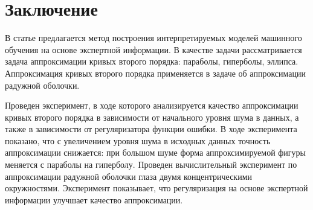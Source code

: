 \documentclass[12pt]{a&t}
\begin{document}
\section{Заключение}
В статье предлагается метод построения интерпретируемых моделей машинного обучения на основе экспертной информации. В качестве задачи рассматривается задача аппроксимации кривых второго порядка: параболы, гиперболы, эллипса. Аппроксимация кривых второго порядка применяется в задаче об аппроксимации радужной оболочки.

Проведен эксперимент, в ходе которого анализируется качество аппроксимации кривых второго порядка в зависимости от начального уровня шума в данных, а также в зависимости от регуляризатора функции ошибки. В ходе эксперимента показано, что с увеличением уровня шума в исходных данных точность аппроксимации снижается: при большом шуме форма аппроксимируемой фигуры меняется с параболы на гиперболу. Проведен вычислительный эксперимент по аппроксимации радужной оболочки глаза двумя концентрическими окружностями. Эксперимент показывает, что регуляризация на основе экспертной информации улучшает качество аппроксимации.
\end{document}
